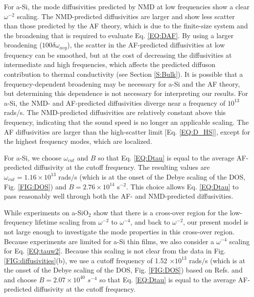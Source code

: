 For a-Si, the mode diffusivities predicted by NMD at 
low frequencies show a clear $\omega^{-2}$ scaling. 
The NMD-predicted diffusivities are larger and show less 
scatter than those predicted by the AF theory, which is due to 
the finite-size system and the broadening that is 
required to evaluate 
Eq. \eqref{EQ:DAF}.\cite{feldman_thermal_1993} By using a larger 
broadening ($100\delta\omega_{avg}$), the scatter 
in the AF-predicted 
diffusivities at low frequency can be smoothed, but at the cost of 
decreasing the diffusivities at intermediate and 
high frequencies, which 
affects the predicted diffuson contribution to thermal 
conductivity (see Section \ref{S:Bulk}). 
It is possible that a frequency-dependent broadening may be 
necessary for a-Si and the AF theory,  
but determining this dependence is not necessary for 
interpreting our results. 
For a-Si, the NMD- and AF-predicted diffusivities diverge 
near a frequency of $10^{13}$ rads$/$s. The NMD-predicted 
diffusivities are relatively constant above this frequency, 
indicating that the sound speed is no longer 
an applicable scaling. The AF diffusivities are 
larger than the high-scatter limit [Eq. \eqref{EQ:D_HS}], 
except for the highest frequency modes, which are localized.
\cite{feldman_thermal_1993} 

For a-Si, we choose $\omega_{cut}$  
and $B$ so that Eq. \eqref{EQ:Dtau} is equal 
to the average AF-predicted diffusivity at the cutoff frequency. 
The resulting values are 
$\omega_{cut}=1.16 \times 10^{13}$ rads$/$s (which is at the onset 
of the Debye scaling of the DOS, Fig. \ref{FIG:DOS})  
and $B=2.76\times10^{14}$ s$^{-2}$. This choice 
allows Eq. \eqref{EQ:Dtau} to pass reasonably well through both 
the AF- and NMD-predicted diffusivities. 

While experiments on a-SiO$_2$ show that there is a cross-over 
region for the low-frequency lifetime scaling from $\omega^{-2}$ to 
$\omega^{-4}$,\cite{masciovecchio_evidence_2006} 
and back to $\omega^{-2}$,
\cite{masciovecchio_evidence_2006,baldi_sound_2010,
baldi_elastic_2011,baldi_emergence_2013} our present model is not 
large enough to investigate the mode properties 
in this cross-over region. 
Because experiments are limited for a-Si thin films, 
\cite{hondongwa_ultrasonic_2011} 
we also consider a $\omega^{-4}$ scaling 
for Eq. \eqref{EQ:tauw2}. Because this scaling is not clear from 
the data in Fig. \ref{FIG:diffusivities}(b),  
we use a cutoff frequency of 1.52 $\times 10^{13}$ rads$/$s 
(which is at the onset 
of the Debye scaling of the DOS, Fig. \ref{FIG:DOS}) 
based on Refs.  and 
and choose $B=2.07\times10^{40}$ $s^{-4}$ so that 
Eq. \eqref{EQ:Dtau} is equal to the average 
AF-predicted diffusivity at the cutoff frequency. 

